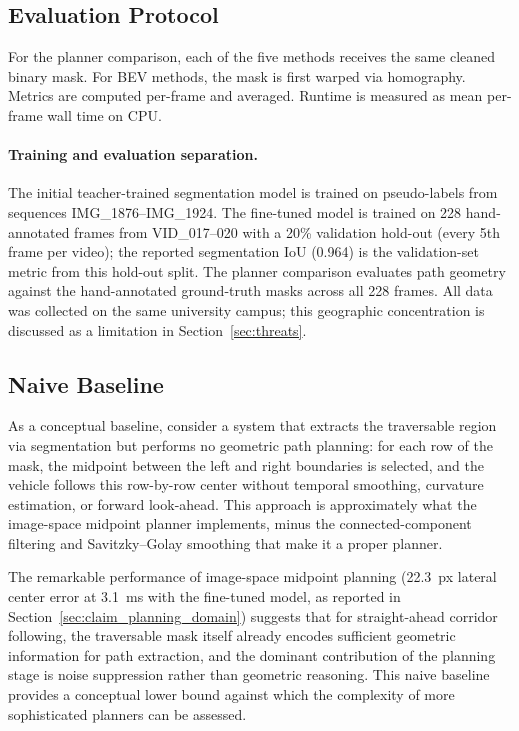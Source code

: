 \documentclass[12pt,letterpaper,oneside]{report}
\begin{document}
\subsection{Evaluation Protocol}

For the planner comparison, each of the five methods receives the same cleaned binary mask. For BEV methods, the mask is first warped via homography. Metrics are computed per-frame and averaged. Runtime is measured as mean per-frame wall time on CPU.

\paragraph{Training and evaluation separation.} The initial teacher-trained segmentation model is trained on pseudo-labels from sequences IMG\_1876--IMG\_1924. The fine-tuned model is trained on 228 hand-annotated frames from VID\_017--020 with a 20\% validation hold-out (every 5th frame per video); the reported segmentation IoU (0.964) is the validation-set metric from this hold-out split.  The planner comparison evaluates path geometry against the hand-annotated ground-truth masks across all 228 frames.  All data was collected on the same university campus; this geographic concentration is discussed as a limitation in Section~\ref{sec:threats}.


\subsection{Naive Baseline}
\label{sec:naive_baseline}

As a conceptual baseline, consider a system that extracts the traversable region via segmentation but performs no geometric path planning: for each row of the mask, the midpoint between the left and right boundaries is selected, and the vehicle follows this row-by-row center without temporal smoothing, curvature estimation, or forward look-ahead.  This approach is approximately what the image-space midpoint planner implements, minus the connected-component filtering and Savitzky--Golay smoothing that make it a proper planner.

The remarkable performance of image-space midpoint planning (22.3~px lateral center error at 3.1~ms with the fine-tuned model, as reported in Section~\ref{sec:claim_planning_domain}) suggests that for straight-ahead corridor following, the traversable mask itself already encodes sufficient geometric information for path extraction, and the dominant contribution of the planning stage is noise suppression rather than geometric reasoning.  This naive baseline provides a conceptual lower bound against which the complexity of more sophisticated planners can be assessed.
\end{document}
